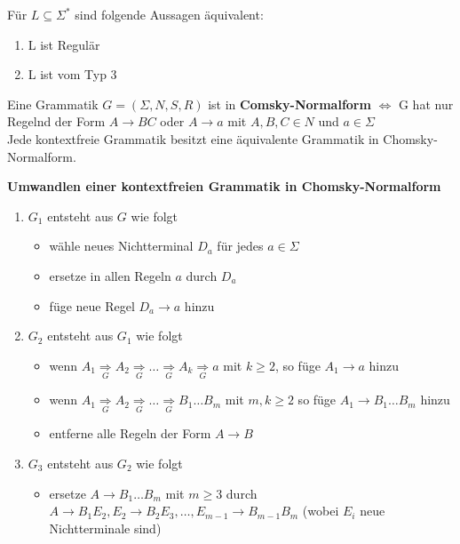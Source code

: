 \documentclass[14pt]{article}
\begin{document}
\begin{eigenschaft}
    Für $L \subseteq \varSigma^*$ sind folgende Aussagen äquivalent:
    \begin{enumerate}
        \item L ist Regulär
        \item L ist vom Typ 3
    \end{enumerate}
\end{eigenschaft}
\begin{definition} 
    Eine Grammatik $G = (\varSigma, N, S, R)$ ist in \textbf{Comsky-Normalform}
    $\Leftrightarrow$ G hat nur Regelnd der Form $A \rightarrow BC$ oder
    $A \rightarrow a$ mit $A, B, C \in N$ und $a \in \varSigma$ \\
    Jede kontextfreie Grammatik besitzt eine äquivalente Grammatik in 
    Chomsky-Normalform. 
\end{definition}
\textbf{Umwandlen einer kontextfreien Grammatik in Chomsky-Normalform}
\begin{enumerate}
    \item $G_1$ entsteht aus $G$ wie folgt
    \begin{itemize}
        \item wähle neues Nichtterminal $D_a$ für jedes $a \in \varSigma$
        \item ersetze in allen Regeln $a$ durch $D_a$
        \item füge neue Regel $D_a \rightarrow a$ hinzu
    \end{itemize}
    \item $G_2$ entsteht aus $G_1$ wie folgt
    \begin{itemize}
        \item wenn $A_1 \underset{G}{\Rightarrow} A_2 \underset{G}{\Rightarrow} 
        \dots \underset{G}{\Rightarrow} A_k
        \underset{G}{\Rightarrow} a$ mit $k \geq 2$, so füge $A_1 \rightarrow a$ hinzu
        \item wenn $A_1 \underset{G}{\Rightarrow} A_2 \underset{G}{\Rightarrow}
        \dots \underset{G}{\Rightarrow} B_1 \dots B_m$ mit $m, k \geq 2$ so füge
        $A_1 \rightarrow B_1 \dots B_m$ hinzu
        \item entferne alle Regeln der Form $A \rightarrow B$
    \end{itemize}
    \item $G_3$ entsteht aus $G_2$ wie folgt
    \begin{itemize}
        \item ersetze $A \rightarrow B_1 \dots B_m$ mit $m \geq 3$ durch \\
        $A \rightarrow B_1E_2, E_2 \rightarrow B_2E_3, \dots , E_{m - 1} 
        \rightarrow B_{m - 1}B_m$ (wobei $E_i$ neue Nichtterminale sind)
    \end{itemize}
\end{enumerate}
\end{document}
